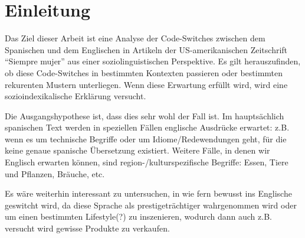 \section{Einleitung}

\begin{comment}
* ca 3/4 Seiten
* Untersuchungsgegenstand
* Erkenntnisinteresse
* Forschungsstand
* Vorgehensweise: also Section 2 macht blabla, Section 3 blablup, ....
* Ergebnisse können/sollen angedeuten werden
\end{comment}




Das Ziel dieser Arbeit ist eine Analyse der Code-Switches zwischen dem Spanischen und dem Englischen in Artikeln der US-amerikanischen Zeitschrift ``Siempre mujer'' aus einer soziolinguistischen Perspektive.
Es gilt herauszufinden, ob diese Code-Switches in bestimmten Kontexten passieren oder bestimmten rekurenten Mustern unterliegen.
Wenn diese Erwartung erfüllt wird, wird eine sozioindexikalische Erklärung versucht.

Die Ausgangshypothese ist, dass dies sehr wohl der Fall ist.
Im hauptsächlich spanischen Text werden in speziellen Fällen englische Ausdrücke erwartet:
z.B. wenn es um technische Begriffe oder um Idiome/Redewendungen geht, für die keine genaue spanische Übersetzung existiert.
Weitere Fälle, in denen wir Englisch erwarten können, sind region-/kulturspezifische Begriffe: Essen, Tiere und Pflanzen, Bräuche, etc.

Es wäre weiterhin interessant zu untersuchen, in wie fern bewusst ins Englische geswitcht wird, da diese Sprache als prestigeträchtiger wahrgenommen wird oder um einen bestimmten Lifestyle(?) zu inszenieren, wodurch dann auch z.B. versucht wird gewisse Produkte zu verkaufen.


